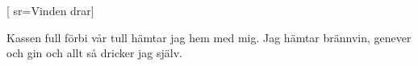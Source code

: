 [				
	sr={Vinden drar}]		
	
\beginverse*						
Kassen full
förbi vår tull
hämtar jag hem med mig.
Jag hämtar brännvin, genever och gin
och allt så dricker jag själv. 
\endverse		
		
\vspace{5mm}
\endsong		

